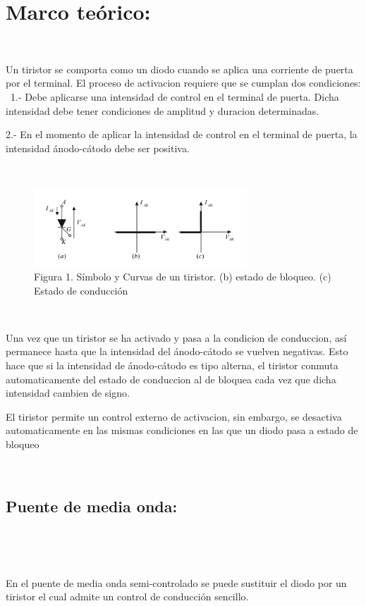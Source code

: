 \documentclass[12pt,letterpaper]{article}
\begin{document}
\section{Marco teórico:}
\

Un tiristor se comporta como un diodo cuando se aplica una corriente de puerta por el terminal. El proceso de activacion requiere que se cumplan dos condiciones:
	\
	1.- Debe aplicarse una intensidad de control en el terminal de puerta. Dicha intensidad debe tener condiciones de amplitud y duracion determinadas.
	\
	
	2.- En el momento de aplicar la intensidad de control en el terminal de puerta, la intensidad ánodo-cátodo debe ser positiva.

\

\begin{figure}[h!]
\begin{center}
\includegraphics[width=8cm]{Tiristores.png} 
\caption{Figura 1. Símbolo y Curvas de un tiristor. (b) estado de bloqueo. (c) Estado de conducción}
\end{center}
\end{figure}

\

Una vez que un tiristor se ha activado y pasa a la condicion de conduccion, así permanece hasta que la intensidad del ánodo-cátodo se vuelven negativas. Esto hace que si la intensidad de ánodo-cátodo es tipo alterna, el tiristor conmuta automaticamente del estado de conduccion al de bloquea cada vez que dicha intensidad cambien de signo.
\

El tiristor permite un control externo de activacion, sin embargo, se desactiva automaticamente en las mismas condiciones en las que un diodo pasa a estado de bloqueo

\

\subsection{Puente de media onda: }
\

\

En el puente de media onda semi-controlado se puede sustituir el diodo por un tiristor el cual admite un control de conducción sencillo.
\
\end{document}

